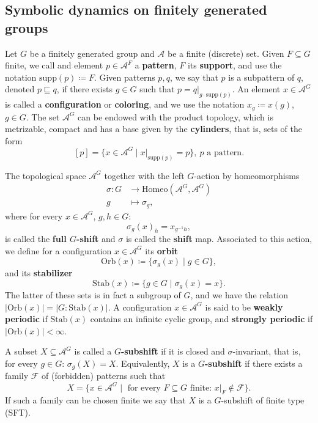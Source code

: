 \documentclass{aims}
\theoremstyle{definition}
\begin{document}
\subsection{Symbolic dynamics on finitely generated groups}
Let $G$ be a finitely generated group and $\mathcal{A}$ be a finite (discrete) set. Given $F\subseteq G$ finite, we call and element $p\in \mathcal{A}^{F}$ a \textbf{pattern}, $F$ its \textbf{support}, and use the notation $\mathrm{supp}(p)\coloneqq F$. Given patterns $p,q$, we say that $p$ is a subpattern of $q$, denoted $p\sqsubseteq q$, if there exists $g\in G$ such that $p=q|_{g\cdot \mathrm{supp}(p)}$. An element $x\in \mathcal{A}^G$ is called a \textbf{configuration} or \textbf{coloring}, and we use the notation $x_g\coloneqq x(g)$, $g\in G$. The set $\mathcal{A}^G$ can be endowed with the product topology, which is metrizable, compact and has a base given by the \textbf{cylinders}, that is, sets of the form
$$
[p]=\{x\in \mathcal{A}^G\mid x|_{\mathrm{supp}(p)}=p \}, \ p\text{ a pattern}.
$$ 


The topological space $\mathcal{A}^G$ together with the left $G$-action by homeomorphisms
\begin{align*}
\sigma:G&\to \mathrm{Homeo}(\mathcal{A}^G,\mathcal{A}^G)\\
g&\mapsto \sigma_g,
\end{align*}
where for every $x\in \mathcal{A}^G$, $g,h\in G$:
$$
\sigma_g(x)_h=x_{g^{-1}h},
$$
is called the \textbf{full $G$-shift} and $\sigma$ is called the \textbf{shift} map. Associated to this action, we define for a configuration $x\in \mathcal{A}^G$ its \textbf{orbit} $$\mathrm{Orb}(x)\coloneqq\{\sigma_g(x)\mid g\in G \},$$ and its \textbf{stabilizer} $$\mathrm{Stab}(x)\coloneqq \{g\in G\mid \sigma_g(x)=x \}.$$ The latter of these sets is in fact a subgroup of $G$, and we have the relation $|\mathrm{Orb}(x)|=|G:\mathrm{Stab}(x)|$. A configuration $x\in \mathcal{A}^G$ is said to be \textbf{weakly periodic} if $\mathrm{Stab}(x)$ contains an infinite cyclic group, and \textbf{strongly periodic} if $|\mathrm{Orb}(x)|<\infty$.


A subset $X\subseteq \mathcal{A}^G$ is called a \textbf{$G$-subshift} if it is closed and $\sigma$-invariant, that is, for every $g\in G$: $\sigma_g(X)=X$. Equivalently, $X$ is a \textbf{$G$-subshift} if there exists a family $\mathcal{F}$ of (forbidden) patterns such that
$$
X=\{x\in \mathcal{A}^G\mid \text{ for every }F\subseteq G \text{ finite: }x|_{F}\notin \mathcal{F}  \}.
$$ 
If such a family can be chosen finite we say that $X$ is a $G$-subshift of finite type (SFT).
\end{document}
